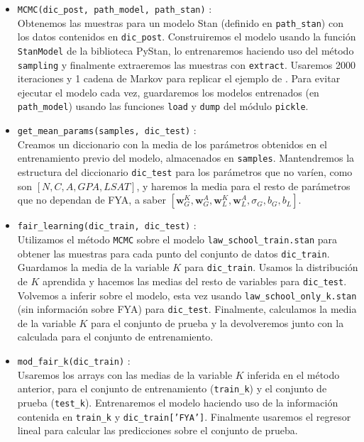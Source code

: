\documentclass[oneside,openright,titlepage,numbers=noenddot,openany,headinclude,footinclude=true,
cleardoublepage=empty,abstractoff,BCOR=5mm,paper=a4,fontsize=12pt,main=spanish]{scrreprt}
\begin{document}
\begin{itemize}
    \item \texttt{MCMC(dic\_post, path\_model, path\_stan)} :\\
    Obtenemos las muestras para un modelo Stan (definido en \texttt{path\_stan}) con los datos contenidos en \texttt{dic\_post}. Construiremos el modelo usando la función \texttt{StanModel} de la biblioteca PyStan, lo entrenaremos haciendo uso del método \texttt{sampling} y finalmente extraeremos las muestras con \texttt{extract}. Usaremos 2000 iteraciones y 1 cadena de Markov para replicar el ejemplo de \cite{counterfactual2018}. Para evitar ejecutar el modelo cada vez, guardaremos los modelos entrenados (en \texttt{path\_model}) usando las funciones \texttt{load} y \texttt{dump} del módulo \texttt{pickle}.\\
    \item \texttt{get\_mean\_params(samples, dic\_test)} :\\
    Creamos un diccionario con la media de los parámetros obtenidos en el entrenamiento previo del modelo, almacenados en \texttt{samples}. Mantendremos la estructura del diccionario \texttt{dic\_test} para los parámetros que no varíen, como son $[N, C, A, GPA, LSAT]$, y haremos la media para el resto de parámetros que no dependan de FYA, a saber $[\textbf{w}^K_G, \textbf{w}^A_G, \textbf{w}^K_L, \textbf{w}^A_L, \sigma_G, b_G, b_L]$.\\
    \item \texttt{fair\_learning(dic\_train, dic\_test)} :\\
    Utilizamos el método \texttt{MCMC} sobre el modelo \texttt{law\_school\_train.stan} para obtener las muestras para cada punto del conjunto de datos \texttt{dic\_train}. Guardamos la media de la variable $K$ para \texttt{dic\_train}. Usamos la distribución de $K$ aprendida y hacemos las medias del resto de variables para \texttt{dic\_test}. Volvemos a inferir sobre el modelo, esta vez usando \texttt{law\_school\_only\_k.stan} (sin información sobre FYA) para \texttt{dic\_test}. Finalmente, calculamos la media de la variable $K$ para el conjunto de prueba y la devolveremos junto con la calculada para el conjunto de entrenamiento.\\
    \item \texttt{mod\_fair\_k(dic\_train)} :\\
    Usaremos los arrays con las medias de la variable $K$ inferida en el método anterior, para el conjunto de entrenamiento (\texttt{train\_k}) y el conjunto de prueba (\texttt{test\_k}). Entrenaremos el modelo haciendo uso de la información contenida en \texttt{train\_k} y \texttt{dic\_train['FYA']}. Finalmente usaremos el regresor lineal para calcular las predicciones sobre el conjunto de prueba.
\end{itemize}
\end{document}
